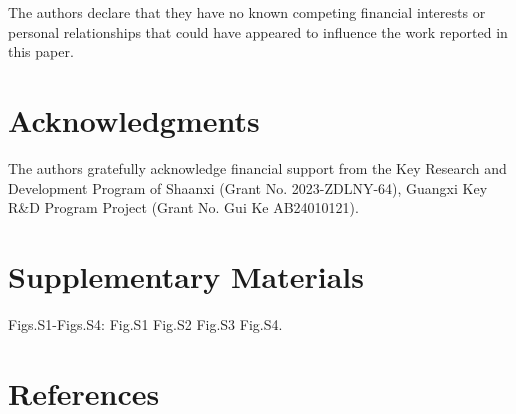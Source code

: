 \documentclass[
]{article}
\begin{document}
The authors declare that they have no known competing financial
interests or personal relationships that could have appeared to
influence the work reported in this paper.

\hypertarget{acknowledgments}{%
\section{Acknowledgments}\label{acknowledgments}}

The authors gratefully acknowledge financial support from the Key
Research and Development Program of Shaanxi (Grant No. 2023-ZDLNY-64),
Guangxi Key R\&D Program Project (Grant No. Gui Ke AB24010121).

\hypertarget{supplementary-materials}{%
\section{Supplementary Materials}\label{supplementary-materials}}

Figs.S1-Figs.S4: Fig.S1 Fig.S2 Fig.S3 Fig.S4.

\hypertarget{references}{%
\section{References}\label{references}}
\end{document}

